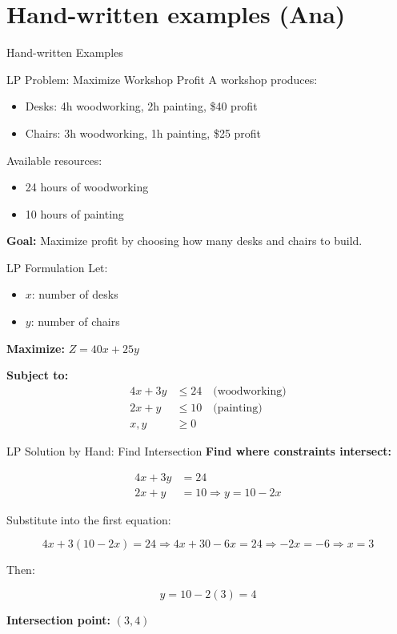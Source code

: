 \documentclass{purdue-slide}
\begin{document}
\section{Hand-written examples (Ana)}

\begin{titleframe}{Hand-written Examples}

\end{titleframe}

\begin{frame}{LP Problem: Maximize Workshop Profit}
	A workshop produces:
	\begin{itemize}
		\item Desks: 4h woodworking, 2h painting, \$40 profit
		\item Chairs: 3h woodworking, 1h painting, \$25 profit
	\end{itemize}

	Available resources:
	\begin{itemize}
		\item 24 hours of woodworking
		\item 10 hours of painting
	\end{itemize}

	\textbf{Goal:} Maximize profit by choosing how many desks and chairs to build.
\end{frame}

\begin{frame}{LP Formulation}
	Let:
	\begin{itemize}
		\item \(x\): number of desks
		\item \(y\): number of chairs
	\end{itemize}

	\textbf{Maximize: } \(Z = 40x + 25y\)

	\textbf{Subject to:}
	\[
		\begin{aligned}
			4x + 3y &\leq 24 \quad \text{(woodworking)} \\
			2x + y &\leq 10 \quad \text{(painting)} \\
			x, y &\geq 0
		\end{aligned}
	\]
\end{frame}

\begin{frame}{LP Solution by Hand: Find Intersection}
	\textbf{Find where constraints intersect:}

	\[
		\begin{aligned}
			4x + 3y &= 24 \\
			2x + y &= 10 \Rightarrow y = 10 - 2x
		\end{aligned}
	\]

	Substitute into the first equation:

	\[
		4x + 3(10 - 2x) = 24 \Rightarrow 4x + 30 - 6x = 24 \Rightarrow -2x = -6 \Rightarrow x = 3
	\]

	Then:

	\[
		y = 10 - 2(3) = 4
	\]

	\textbf{Intersection point: } \((3, 4)\)
\end{frame}
\end{document}
